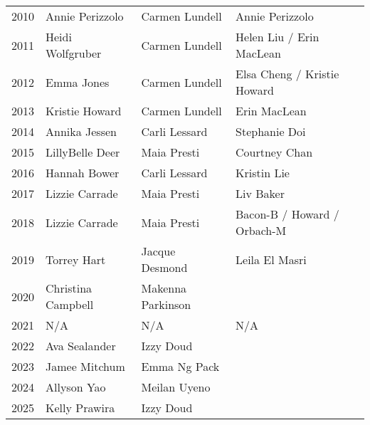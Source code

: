 \begin{table}[H]
{\begin{tabular}{c | l | l | l}
2010 & Annie Perizzolo & Carmen Lundell & Annie Perizzolo \\
2011 & Heidi Wolfgruber & Carmen Lundell & Helen Liu / Erin MacLean \\
2012 & Emma Jones & Carmen Lundell & Elsa Cheng / Kristie Howard \\
2013 & Kristie Howard & Carmen Lundell & Erin MacLean \\
2014 & Annika Jessen & Carli Lessard & Stephanie Doi \\
2015 & LillyBelle Deer & Maia Presti & Courtney Chan \\
2016 & Hannah Bower & Carli Lessard & Kristin Lie \\
2017 & Lizzie Carrade & Maia Presti & Liv Baker \\
2018 & Lizzie Carrade & Maia Presti & Bacon-B / Howard / Orbach-M \\
2019 & Torrey Hart & Jacque Desmond & Leila El Masri \\
2020 & Christina Campbell & Makenna Parkinson & \\
2021 & N/A & N/A & N/A \\
2022 & Ava Sealander & Izzy Doud & \\
2023 & Jamee Mitchum & Emma Ng Pack & \\
2024 & Allyson Yao & Meilan Uyeno & \\
2025 & Kelly Prawira & Izzy Doud & \\
\bottomrule
\end{tabular}%
}
\end{table}

